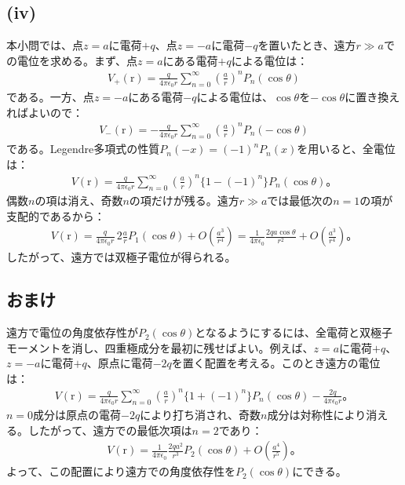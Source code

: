 \documentclass[platex,dvipdfmx,a4paper]{jsarticle}
\newcommand{\vect}[1]{\boldsymbol{\mathrm{#1}}}
\newcommand{\ssum}[3]{\sum_{#1=#2}^#3}
\begin{document}
  \subsection*{(iv)}
  本小問では、点$z=a$に電荷$+q$、点$z=-a$に電荷$-q$を置いたとき、遠方$r\gg a$での電位を求める。まず、点$z=a$にある電荷$+q$による電位は：
  \begin{align*}
    V_+(\vect{r})=\frac{q}{4\pi\epsilon_0 r}\ssum{n}{0}{\infty}\left(\frac{a}{r}\right)^nP_n(\cos\theta)
  \end{align*}
  である。一方、点$z=-a$にある電荷$-q$による電位は、$\cos\theta$を$-\cos\theta$に置き換えればよいので：
  \begin{align*}
    V_-(\vect{r})=-\frac{q}{4\pi\epsilon_0 r}\ssum{n}{0}{\infty}\left(\frac{a}{r}\right)^nP_n(-\cos\theta)
  \end{align*}
  である。Legendre多項式の性質$P_n(-x)=(-1)^nP_n(x)$を用いると、全電位は：
  \begin{align*}
    V(\vect{r})=\frac{q}{4\pi\epsilon_0 r}\ssum{n}{0}{\infty}\left(\frac{a}{r}\right)^n\{1-(-1)^n\}P_n(\cos\theta)。
  \end{align*}
  偶数$n$の項は消え、奇数$n$の項だけが残る。遠方$r\gg a$では最低次の$n=1$の項が支配的であるから：
  \begin{align*}
    V(\vect{r})=\frac{q}{4\pi\epsilon_0 r}\,2\frac{a}{r}P_1(\cos\theta)+O\left(\frac{a^3}{r^4}\right)=\frac{1}{4\pi\epsilon_0}\frac{2qa\cos\theta}{r^2}+O\left(\frac{a^3}{r^4}\right)。
  \end{align*}
  したがって、遠方では双極子電位が得られる。
  
  \subsection*{おまけ}
  遠方で電位の角度依存性が$P_2(\cos\theta)$となるようにするには、全電荷と双極子モーメントを消し、四重極成分を最初に残せばよい。例えば、$z=a$に電荷$+q$、$z=-a$に電荷$+q$、原点に電荷$-2q$を置く配置を考える。このとき遠方の電位は：
  \begin{align*}
    V(\vect{r})=\frac{q}{4\pi\epsilon_0 r}\ssum{n}{0}{\infty}\left(\frac{a}{r}\right)^n\{1+(-1)^n\}P_n(\cos\theta)-\frac{2q}{4\pi\epsilon_0 r}。
  \end{align*}
  $n=0$成分は原点の電荷$-2q$により打ち消され、奇数$n$成分は対称性により消える。したがって、遠方での最低次項は$n=2$であり：
  \begin{align*}
    V(\vect{r})=\frac{1}{4\pi\epsilon_0}\frac{2qa^2}{r^3}P_2(\cos\theta)+O\left(\frac{a^4}{r^5}\right)。
  \end{align*}
  よって、この配置により遠方での角度依存性を$P_2(\cos\theta)$にできる。
  
\end{document}
